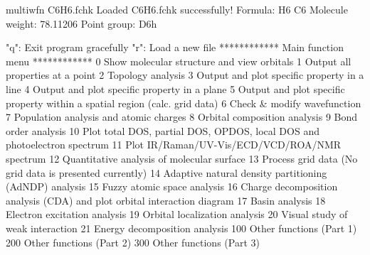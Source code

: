 \documentclass[a4paper,11pt,openany]{memoir}
\begin{document}
\begin{appendices}
\begin{consola}{multiwfn C6H6.fchk}
Loaded C6H6.fchk successfully!
Formula: H6 C6 
Molecule weight:        78.11206
Point group: D6h

"q": Exit program gracefully          "r": Load a new file
************ Main function menu ************
0 Show molecular structure and view orbitals
1 Output all properties at a point
2 Topology analysis
3 Output and plot specific property in a line
4 Output and plot specific property in a plane
5 Output and plot specific property within a spatial region (calc. grid data)
6 Check & modify wavefunction
7 Population analysis and atomic charges
8 Orbital composition analysis
9 Bond order analysis
10 Plot total DOS, partial DOS, OPDOS, local DOS and photoelectron spectrum
11 Plot IR/Raman/UV-Vis/ECD/VCD/ROA/NMR spectrum
12 Quantitative analysis of molecular surface
13 Process grid data (No grid data is presented currently)
14 Adaptive natural density partitioning (AdNDP) analysis
15 Fuzzy atomic space analysis
16 Charge decomposition analysis (CDA) and plot orbital interaction diagram
17 Basin analysis                    18 Electron excitation analysis
19 Orbital localization analysis     20 Visual study of weak interaction
21 Energy decomposition analysis
100 Other functions (Part 1)         200 Other functions (Part 2)
300 Other functions (Part 3)
\end{consola}


\end{appendices}
\end{document}
